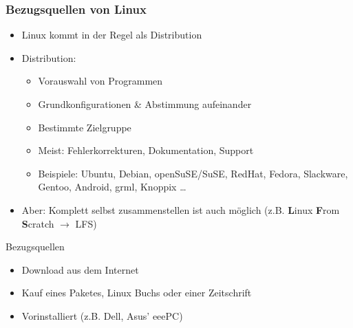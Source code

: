 \documentclass[compress]{beamer}
\begin{document}
\begin{frame}
	\frametitle{Bezugsquellen von Linux}
	\begin{block}{}
		\begin{itemize}
			\item Linux kommt in der Regel als Distribution
			\item Distribution:
				\begin{itemize}
					\item Vorauswahl von Programmen
					\item Grundkonfigurationen \& Abstimmung aufeinander
					\item Bestimmte Zielgruppe
					\item Meist: Fehlerkorrekturen, Dokumentation, Support
					\item Beispiele: Ubuntu, Debian, openSuSE/SuSE, RedHat, 
						Fedora, Slackware, Gentoo, Android, grml, Knoppix \dots{}
				\end{itemize}
			\item Aber: Komplett selbst zusammenstellen ist auch möglich 
				(z.B. \textbf{L}inux \textbf{F}rom \textbf{S}cratch 
				$\rightarrow$ LFS)
		\end{itemize}
	\end{block}
	\pause
	\begin{block}{Bezugsquellen}
		\begin{itemize}
			\item Download aus dem Internet
			\item Kauf eines Paketes, Linux Buchs oder einer Zeitschrift
			\item Vorinstalliert (z.B. Dell, Asus' eeePC)
		\end{itemize}
	\end{block}
\end{frame}
\end{document}
